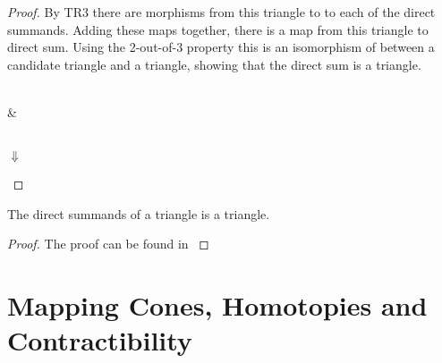 \begin{proof}
        By TR3 there are morphisms from this triangle to to each of the direct summands. Adding these maps together, there is a map from this triangle to direct sum. Using the 2-out-of-3 property this is an isomorphism of between a candidate triangle and a triangle, showing that the direct sum is a triangle.
        \begin{center}
             \\
            \& \\
             \\
            $\Downarrow$ \\
        \end{center}
    \end{proof}

    \begin{lemma}
        The direct summands of a triangle is a triangle.
    \end{lemma}

    \begin{proof}
        The proof can be found in \cite{neeman}
    \end{proof}
    

\section{Mapping Cones, Homotopies and Contractibility}

